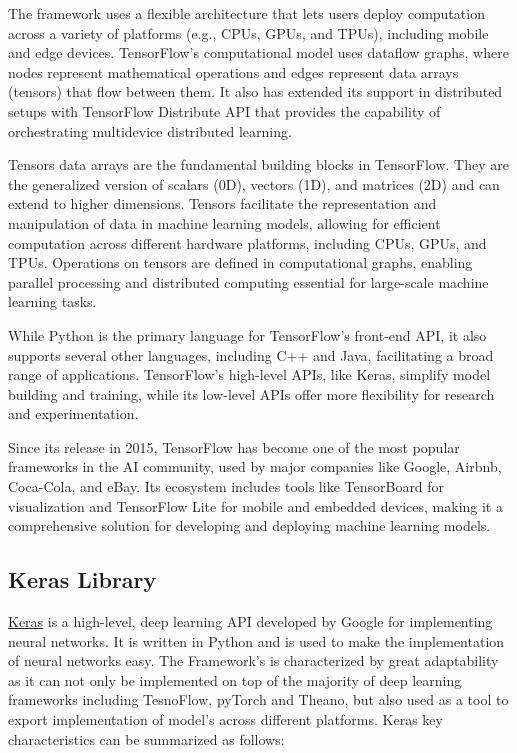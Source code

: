 The framework uses a flexible architecture that lets users deploy computation across a variety of platforms (e.g., CPUs, GPUs, and TPUs), including mobile
and edge devices. TensorFlow's computational model uses dataflow graphs, where nodes represent mathematical operations and edges represent data arrays (tensors)
that flow between them. It also has extended its support in distributed setups with TensorFlow Distribute API that provides the capability of orchestrating
multidevice distributed learning.

Tensors data arrays are the fundamental building blocks in TensorFlow. They are the generalized version of scalars
(0D), vectors (1D), and matrices (2D) and can extend to higher dimensions. Tensors facilitate the representation and manipulation of data in machine learning models,
allowing for efficient computation across different hardware platforms, including CPUs, GPUs, and TPUs. Operations on tensors are defined in computational graphs,
enabling parallel processing and distributed computing essential for large-scale machine learning tasks.

While Python is the primary language for TensorFlow's front-end API, it also supports several other languages, including C++ and Java, facilitating a broad range
of applications. TensorFlow's high-level APIs, like Keras, simplify model building and training, while its low-level APIs offer more flexibility for research and
experimentation.

Since its release in 2015, TensorFlow has become one of the most popular frameworks in the AI community, used by major companies like Google, Airbnb, Coca-Cola, and eBay.
Its ecosystem includes tools like TensorBoard for visualization and TensorFlow Lite for mobile and embedded devices, making it a comprehensive solution for developing and
deploying machine learning models.

\subsection{Keras Library}
\href{https://keras.io/}{Keras} is a high-level, deep learning API developed by Google for implementing neural networks. It is written in Python and is used to make the implementation of neural networks easy.
The Framework's is characterized by great adaptability as it can not only be implemented on top of the majority of deep learning frameworks including TesnoFlow, pyTorch and Theano,
but also used as a tool to export implementation of model's across different platforms. Keras key characteristics can be summarized as follows:

